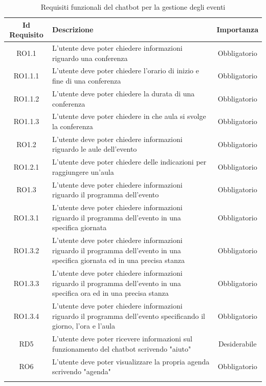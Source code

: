 \normalsize
\begin{longtable}{|c|>{\centering}m{7cm}|c|}
\hline
\textbf{Id Requisito} & \textbf{Descrizione} & \textbf{Importanza}\\
\hline
\endhead
RO1.1 & L'utente deve poter chiedere informazioni riguardo una conferenza & Obbligatorio\\ 
RO1.1.1 & L'utente deve poter chiedere l'orario di inizio e fine di una conferenza & Obbligatorio\\ 
RO1.1.2 & L'utente deve poter chiedere la durata di una conferenza & Obbligatorio\\
RO1.1.3 & L'utente deve poter chiedere in che aula si svolge la conferenza & Obbligatorio\\  
RO1.2 & L'utente deve poter chiedere informazioni riguardo le aule dell'evento & Obbligatorio\\ 
RO1.2.1 & L'utente deve poter chiedere delle indicazioni per raggiungere un'aula & Obbligatorio\\ 
RO1.3 & L'utente deve poter chiedere informazioni riguardo il programma dell'evento & Obbligatorio\\ 
RO1.3.1 & L'utente deve poter chiedere informazioni riguardo il programma dell'evento in una specifica giornata & Obbligatorio\\ 
RO1.3.2 & L'utente deve poter chiedere informazioni riguardo il programma dell'evento in una specifica giornata ed in una precisa stanza & Obbligatorio\\
RO1.3.3 & L'utente deve poter chiedere informazioni riguardo il programma dell'evento in una specifica ora ed in una precisa stanza & Obbligatorio\\
RO1.3.4 & L'utente deve poter chiedere informazioni riguardo il programma dell'evento specificando il giorno, l'ora e l'aula & Obbligatorio\\
RD5 & L'utente deve poter ricevere informazioni sul funzionamento del \gls{chatbot} scrivendo "aiuto" & Desiderabile\\ 
RO6 & L'utente deve poter visualizzare la propria agenda scrivendo "agenda" & Obbligatorio\\ 
\hline
\caption{Requisiti funzionali del chatbot per la gestione degli eventi}
\end{longtable}

